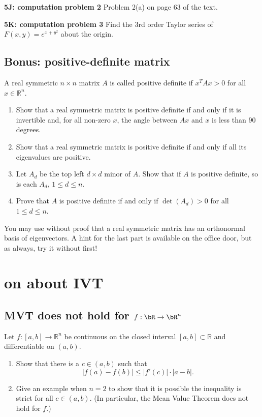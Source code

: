 \documentclass[lang=cn,11pt]{template}
\begin{document}
\noindent \textbf{5J: computation problem 2}
Problem 2(a) on page 63 of the text.

\noindent \textbf{5K: computation problem 3}
Find the 3rd order Taylor series of $F(x, y) = e^{x + y^2}$ about the origin.

\section{Bonus: positive-definite matrix}
A real symmetric $n \times n$ matrix $A$ is called positive definite if $x^T A x > 0$ for all $x \in \mathbb{R}^n$.
\begin{enumerate}
    \item Show that a real symmetric matrix is positive definite if and only if it is invertible and, for all non-zero $x$, the angle between $Ax$ and $x$ is less than 90 degrees.
    \item Show that a real symmetric matrix is positive definite if and only if all its eigenvalues are positive.
    \item Let $A_d$ be the top left $d \times d$ minor of $A$. Show that if $A$ is positive definite, so is each $A_d$, $1 \leq d \leq n$.
    \item Prove that $A$ is positive definite if and only if $\det(A_d) > 0$ for all $1 \leq d \leq n$.
\end{enumerate}

You may use without proof that a real symmetric matrix has an orthonormal basis of eigenvectors. A hint for the last part is available on the office door, but as always, try it without first!










\chapter{on about IVT}

\section{MVT does not hold for $f: \bR \rightarrow \bR^n$}
Let $f : [a, b] \to \mathbb{R}^n$ be continuous on the closed interval $[a, b] \subset \mathbb{R}$ and differentiable on $(a, b)$.
\begin{enumerate}
    \item Show that there is a $c \in (a, b)$ such that
    \[
    |f(a) - f(b)| \leq |f'(c)| \cdot |a - b|.
    \]
    \item Give an example when $n = 2$ to show that it is possible the inequality is strict for all $c \in (a, b)$. (In particular, the Mean Value Theorem does not hold for $f$.)
\end{enumerate}
\end{document}
